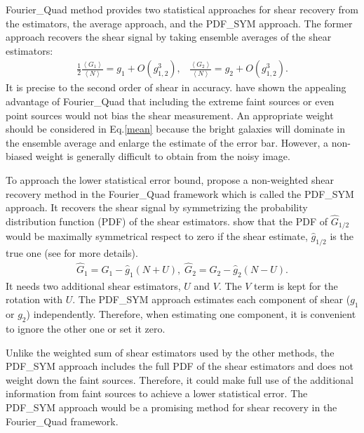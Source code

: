 \documentclass[twocolumn]{aastex62}
\begin{document}
Fourier\_Quad method provides two statistical approaches for shear recovery from the estimators, the average approach, and the PDF\_SYM approach. The former approach recovers the shear signal by taking ensemble averages of the shear estimators:
\begin{eqnarray}
\label{mean}
\frac{1}{2}\frac{\left\langle  G_1\right\rangle }{\left\langle  N\right\rangle }=g_1+O(g_{1,2}^3),\;\;\;\frac{\left\langle  G_2\right\rangle }{\left\langle  N\right\rangle }=g_2+O(g_{1,2}^3).
\end{eqnarray}
It is precise to the second order of shear in accuracy\citep{Zhang2015}. \cite{Zhang2015} have shown the appealing advantage of Fourier\_Quad that including the extreme faint sources or even point sources would not bias the shear measurement. An appropriate weight should be considered in Eq.\ref{mean} because the bright galaxies will dominate in the ensemble average and enlarge the estimate of the error bar. However, a non-biased weight is generally difficult to obtain from the noisy image.

To approach the lower statistical error bound, \cite{Zhang2017} propose a non-weighted shear recovery method in the Fourier\_Quad framework which is called the PDF\_SYM approach. It recovers the shear signal by symmetrizing the probability distribution function (PDF) of the shear estimators. \cite{Zhang2017} show that the PDF of $\hat{G}_{1/2}$ would be maximally symmetrical respect to zero if the shear estimate, $\hat{g}_{1/2}$ is the true one (see \cite{Zhang2017} for more details). 
\begin{eqnarray}
\hat{G}_{1} = G_1 - \hat{g}_{1}(N + U), \;
\hat{G}_{2} = G_2 - \hat{g}_{2}(N - U).
\end{eqnarray}
It needs two additional shear estimators, $U$ and $V$. The $V$ term is kept for the rotation with $U$. The PDF\_SYM approach estimates each component of shear ($g_1$ or $g_2$) independently. Therefore, when estimating one component, it is convenient to ignore the other one or set it zero.   

Unlike the weighted sum of shear estimators used by the other methods, the PDF\_SYM approach includes the full PDF of the shear estimators and does not weight down the faint sources. Therefore, it could make full use of the additional information from faint sources to achieve a lower statistical error. The PDF\_SYM approach would be a promising method for shear recovery in the Fourier\_Quad framework.
\end{document}
